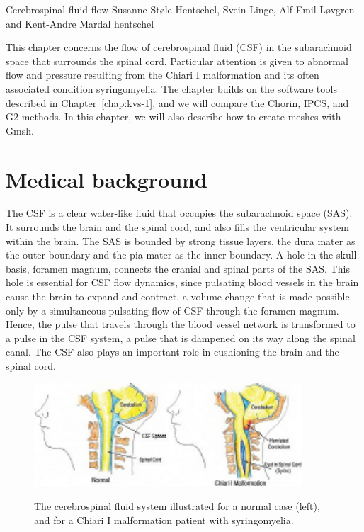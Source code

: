              {Cerebrospinal fluid flow}
              {Susanne St\o le-Hentschel, Svein Linge, Alf Emil L{\o}vgren and Kent-Andre Mardal}
              {hentschel}


This chapter concerns the flow of cerebrospinal fluid (CSF) in the subarachnoid space that 
surrounds the spinal cord. Particular attention is given to abnormal flow and pressure resulting from 
the Chiari I malformation and its often associated condition syringomyelia. 
The chapter builds on the software tools described in Chapter~\ref{chap:kvs-1}, and
we will compare the Chorin, IPCS, and G2 methods. 
In this chapter, we will also describe how to create meshes with Gmsh.  





\section{Medical background}

The CSF is a clear water-like fluid that occupies the subarachnoid space (SAS).
It surrounds the brain and the spinal cord, and also fills the ventricular
system within the brain. The SAS is bounded by strong tissue layers, the dura
mater as the outer boundary and the pia mater as the inner boundary. A hole in
the skull basis, foramen magnum, connects the cranial
and spinal parts of the SAS. This hole is essential for CSF flow dynamics,
since pulsating blood vessels in the brain cause the brain to expand and
contract, a volume change that is made possible only by a simultaneous
pulsating flow of CSF through the foramen magnum. Hence, the pulse that travels
through the blood vessel network is transformed to a pulse in the CSF system, a
pulse that is dampened on its way along the spinal canal. The CSF also plays an
important role in cushioning the brain and the spinal cord.

\begin{figure}\begin{center}
\includegraphics[width=100mm]{chapters/hentschel/pdf/chiara_about.pdf}
\caption{The cerebrospinal fluid system illustrated for a normal case (left), 
    and for a Chiari I malformation patient with syringomyelia.}
\label{fig:anatomy}
\end{center}\end{figure}

